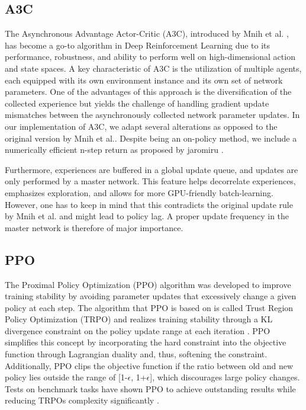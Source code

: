 \documentclass[letterpaper, 10 pt, conference]{ieeeconf}  %
\begin{document}
\subsection{A3C}
The Asynchronous Advantage Actor-Critic (A3C), introduced by Mnih et al. \cite{mnihAsynchronousMethodsDeep2016}, has become a go-to algorithm in 
Deep Reinforcement Learning due to its performance, robustness, and ability to perform well on high-dimensional action and state spaces. 
A key characteristic of A3C is the utilization of multiple agents, each equipped with its own environment instance and its own set of network parameters. 
One of the advantages of this approach is the diversification of the collected experience but yields the challenge of handling gradient update 
mismatches between the asynchronously collected network parameter updates. 
In our implementation of A3C, we adapt several alterations as opposed to the original version by Mnih et al.. Despite being an on-policy method, we include a numerically efficient n-step return as proposed by jaromiru \cite{janischLetMakeA3C}. %

Furthermore, experiences are buffered in a global update 
queue, and updates are only performed by a master network. This feature helps decorrelate experiences, emphasizes exploration, and allows for more GPU-friendly
batch-learning. However, one has to keep in mind that this contradicts the original update rule by Mnih et al. and might lead to policy lag. A proper update 
frequency in the master network is therefore of major importance.

\subsection{PPO}

The Proximal Policy Optimization (PPO) algorithm was developed to improve training stability by avoiding parameter updates that excessively change a given policy at each step. The algorithm that PPO is based on is called Trust Region Policy Optimization (TRPO) and realizes training stability through a KL divergence constraint on the policy update range at each iteration \cite{pmlr-v37-schulman15}. PPO simplifies this concept by incorporating the hard constraint into the objective function through Lagrangian duality and, thus, softening the constraint. Additionally, PPO clips the objective function if the ratio between old and new policy lies outside the range of [1-$\epsilon$, 1+$\epsilon$], which discourages large policy changes. Tests on benchmark tasks have shown PPO to achieve outstanding results while reducing TRPOs complexity significantly \cite{DBLP:journals/corr/SchulmanWDRK17}.
\end{document}
